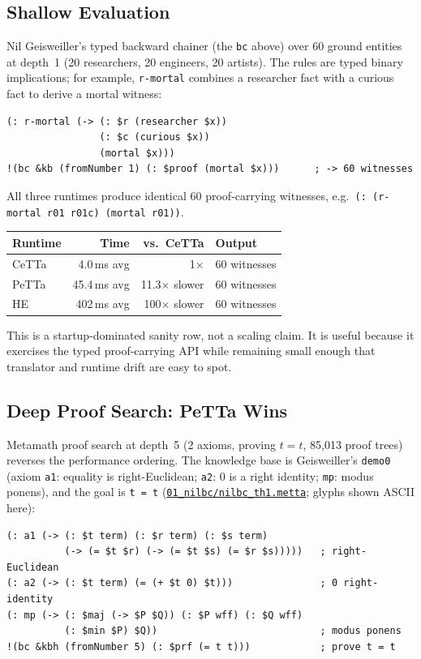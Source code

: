 \documentclass[11pt]{article}
\newcommand{\code}[1]{\texttt{#1}}
\newcommand{\PeTTa}{\textup{PeTTa}}
\newcommand{\HE}{\textup{HE}}
\newcommand{\CeTTa}{\textup{CeTTa}}
\begin{document}
\subsection{Shallow Evaluation}

Nil Geisweiller's typed backward chainer (the \code{bc} above) over
60 ground entities at depth~1 (20 researchers, 20 engineers, 20
artists).  The rules are typed binary implications; for example,
\code{r-mortal} combines a researcher fact with a curious fact to
derive a mortal witness:
\begin{lstlisting}[language={},basicstyle=\ttfamily\scriptsize]
(: r-mortal (-> (: $r (researcher $x))
                (: $c (curious $x))
                (mortal $x)))
!(bc &kb (fromNumber 1) (: $proof (mortal $x)))      ; -> 60 witnesses
\end{lstlisting}
All three runtimes produce identical 60 proof-carrying witnesses, e.g.\
\code{(: (r-mortal r01 r01c) (mortal r01))}.

\begin{center}
\begin{tabular}{lrrl}
\toprule
Runtime & Time & vs.\ \CeTTa{} & Output \\
\midrule
\CeTTa{} & 4.0\,ms avg  & 1$\times$           & 60 witnesses \\
\PeTTa{} & 45.4\,ms avg & 11.3$\times$ slower & 60 witnesses \\
\HE{}    & 402\,ms avg  & 100$\times$ slower  & 60 witnesses \\
\bottomrule
\end{tabular}
\end{center}

This is a startup-dominated sanity row, not a scaling claim.  It is
useful because it exercises the typed proof-carrying API while
remaining small enough that translator and runtime drift are easy to
spot.

\subsection{Deep Proof Search: \PeTTa{} Wins}

Metamath proof search at depth~5 (2 axioms, proving $t = t$,
85{,}013 proof trees) reverses the performance ordering.  The knowledge
base is Geisweiller's \code{demo0} (axiom \code{a1}: equality is
right-Euclidean; \code{a2}: $0$ is a right identity; \code{mp}: modus
ponens), and the goal is \code{t = t}
(\href{https://github.com/zariuq/CeTTa/blob/07928677c0237a19b2f3c32dffca28d7d2626723/benchmarks/chaining_crossengine/01_nilbc/nilbc_th1.metta}{\code{01\_nilbc/nilbc\_th1.metta}};
glyphs shown ASCII here):
\begin{lstlisting}[language={},basicstyle=\ttfamily\scriptsize]
(: a1 (-> (: $t term) (: $r term) (: $s term)
          (-> (= $t $r) (-> (= $t $s) (= $r $s)))))   ; right-Euclidean
(: a2 (-> (: $t term) (= (+ $t 0) $t)))               ; 0 right-identity
(: mp (-> (: $maj (-> $P $Q)) (: $P wff) (: $Q wff)
          (: $min $P) $Q))                            ; modus ponens
!(bc &kbh (fromNumber 5) (: $prf (= t t)))            ; prove t = t
\end{lstlisting}
\end{document}
